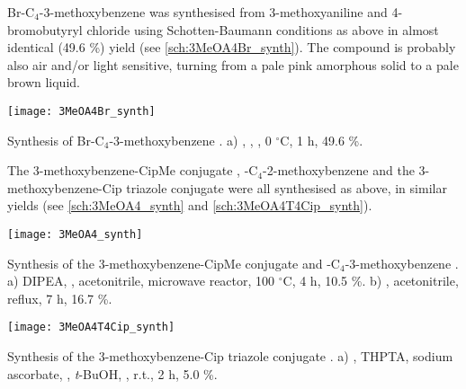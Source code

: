 Br-C$_4$-3-methoxybenzene  was synthesised from 3-methoxyaniline  and 4-bromobutyryl chloride  using Schotten-Baumann conditions as above in almost identical (49.6 \%) yield (see \ref{sch:3MeOA4Br_synth}). 
The compound is probably also air and/or light sensitive, turning from a pale pink amorphous solid to a pale brown liquid. 

\begin{scheme}[H]
	\begin{center}
		\texttt{[image: 3MeOA4Br\_synth]}
		\caption{Synthesis of Br-C$_4$-3-methoxybenzene .
			a) , , , 0 $^{\circ}$C, 1 h, 49.6 \%. \label{sch:3MeOA4Br_synth}}
	\end{center}
\end{scheme}

The 3-methoxybenzene-CipMe conjugate , 
-C$_4$-2-methoxybenzene  
and the 3-methoxybenzene-Cip triazole conjugate  were all synthesised as above, in similar yields (see \ref{sch:3MeOA4_synth} and \ref{sch:3MeOA4T4Cip_synth}).

\begin{scheme}[H]
	\begin{center}
		\texttt{[image: 3MeOA4\_synth]}
		\caption{Synthesis of the 3-methoxybenzene-CipMe conjugate  and -C$_4$-3-methoxybenzene . 
				a)  DIPEA, , acetonitrile, microwave reactor, 100 $^{\circ}$C, 4 h, 10.5 \%.
				b) , acetonitrile, reflux, 7 h, 16.7 \%.  \label{sch:3MeOA4_synth}}
	\end{center}
\end{scheme}

\begin{scheme}[H]
	\begin{center}
				\texttt{[image: 3MeOA4T4Cip\_synth]}
		\caption{Synthesis of the 3-methoxybenzene-Cip triazole conjugate . 
				a) , THPTA, sodium ascorbate, , \textit{t}-BuOH, , r.t., 2 h, 5.0 \%. \label{sch:3MeOA4T4Cip_synth}}
	\end{center}
\end{scheme}

